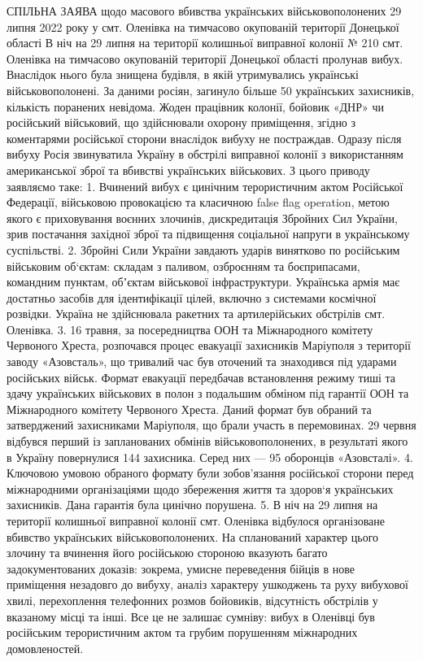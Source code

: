 СПІЛЬНА ЗАЯВА
щодо масового вбивства українських військовополонених 29 липня 2022 року
у смт. Оленівка на тимчасово окупованій території Донецької області
В ніч на 29 липня на території колишньої виправної колонії № 210 смт. Оленівка на тимчасово окупованій території Донецької області пролунав вибух. Внаслідок нього була знищена будівля, в якій утримувались українські військовополонені. За даними росіян, загинуло більше 50 українських захисників, кількість поранених невідома.
Жоден працівник колонії, бойовик «ДНР» чи російський військовий, що здійснювали охорону приміщення, згідно з коментарями російської сторони внаслідок вибуху не постраждав. Одразу після вибуху Росія звинуватила Україну в обстрілі виправної колонії з використанням американської зброї та вбивстві українських військових. З цього приводу заявляємо таке:
1. Вчинений вибух є цинічним терористичним актом Російської Федерації, військовою провокацією та класичною false flag operation, метою якого є приховування воєнних злочинів, дискредитація Збройних Сил України, зрив постачання західної зброї та підвищення соціальної напруги в українському суспільстві.
2. Збройні Сили України завдають ударів винятково по російським військовим об‘єктам: складам з паливом, озброєнням та боєприпасами, командним пунктам, обʼєктам військової інфраструктури. Українська армія має достатньо засобів для ідентифікації цілей, включно з системами космічної розвідки. Україна не здійснювала ракетних та артилерійських обстрілів смт. Оленівка.
3. 16 травня, за посередництва ООН та Міжнародного комітету Червоного Хреста, розпочався процес евакуації захисників Маріуполя з території заводу «Азовсталь», що тривалий час був оточений та знаходився під ударами російських військ. Формат евакуації передбачав встановлення режиму тиші та здачу українських військових в полон з подальшим обміном під гарантії ООН та Міжнародного комітету Червоного Хреста. Даний формат був обраний та затверджений захисниками Маріуполя, що брали участь в перемовинах. 29 червня відбувся перший із запланованих обмінів військовополонених, в результаті якого в Україну повернулися 144 захисника. Серед них — 95 оборонців «Азовсталі».
4. Ключовою умовою обраного формату були зобов’язання російської сторони перед міжнародними організаціями щодо збереження життя та здоров‘я українських захисників. Дана гарантія була цинічно порушена.
5. В ніч на 29 липня на території колишньої виправної колонії смт. Оленівка відбулося організоване вбивство українських військовополонених. На спланований характер цього злочину та вчинення його російською стороною вказують багато задокументованих доказів: зокрема, умисне переведення бійців в нове приміщення незадовго до вибуху, аналіз характеру ушкоджень та руху вибухової хвилі, перехоплення телефонних розмов бойовиків, відсутність обстрілів у вказаному місці та інші. Все це не залишає сумніву: вибух в Оленівці був російським терористичним актом та грубим порушенням міжнародних домовленостей.
